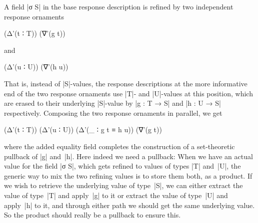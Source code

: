 \begin{itemize}
A field |σ S| in the base response description is refined by two independent response ornaments
\savecolumns
\begin{code}
(Δ'(t ∶ T))  (∇'(g t))
\end{code}
and
\restorecolumns
\begin{code}
(Δ'(u ∶ U))  (∇'(h u))
\end{code}
That is, instead of |S|-values, the response descriptions at the more informative end of the two response ornaments use |T|- and |U|-values at this position, which are erased to their underlying |S|-value by |g : T → S| and |h : U → S| respectively.
Composing the two response ornaments in parallel, we get
\begin{code}
(Δ'(t ∶ T)) (Δ'(u ∶ U)) (Δ'(_ ∶ g t ≡ h u)) (∇'(g t))
\end{code}
where the added equality field completes the construction of a set-theoretic pullback of |g| and~|h|.
Here indeed we need a pullback:
When we have an actual value for the field |σ S|, which gets refined to values of types |T| and~|U|, the generic way to mix the two refining values is to store them both, as a product. If we wish to retrieve the underlying value of type~|S|, we can either extract the value of type~|T| and apply~|g| to it or extract the value of type~|U| and apply~|h| to it, and through either path we should get the same underlying value.
So the product should really be a pullback to ensure this.
\end{itemize}


